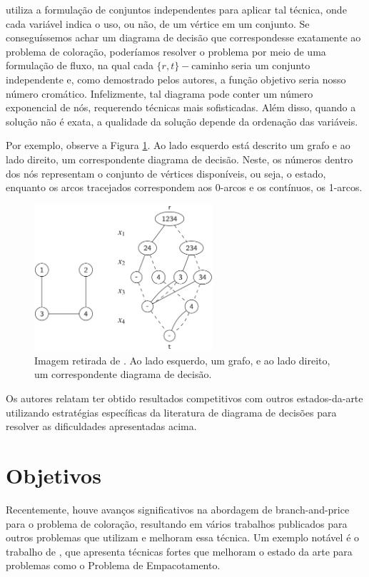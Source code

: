 \documentclass[11pt]{article}
\begin{document}
\textcite{Hoeve2021Graphcoloringdecision} utiliza a formulação de conjuntos independentes para aplicar tal técnica, onde cada variável indica o uso, ou não, de um vértice em um conjunto.
Se conseguíssemos achar um diagrama de decisão que correspondesse exatamente ao problema de coloração, poderíamos resolver o problema por meio de uma formulação de fluxo, na qual cada \(\{r,t\}-\text{caminho}\) seria um conjunto independente e, como demostrado pelos autores, a função objetivo seria nosso número cromático.
Infelizmente, tal diagrama pode conter um número exponencial de nós, requerendo técnicas mais sofisticadas.
Além disso, quando a solução não é exata, a qualidade da solução depende da ordenação das variáveis.

Por exemplo, observe a Figura \ref{fig:diagrama_decisão}.
Ao lado esquerdo está descrito um grafo e ao lado direito, um correspondente diagrama de decisão.
Neste, os números dentro dos nós representam o conjunto de vértices disponíveis, ou seja, o estado, enquanto os arcos tracejados correspondem aos 0-arcos e os contínuos, os 1-arcos.

\begin{figure}[htbp]
\centering
\includegraphics[width=250px]{./diagrama_decisao.png}
\caption{\label{fig:diagrama_decisão}Imagem retirada de \autocite{Hoeve2021Graphcoloringdecision}. Ao lado esquerdo, um grafo, e ao lado direito, um correspondente diagrama de decisão.}
\end{figure}

Os autores relatam ter obtido resultados competitivos com outros estados-da-arte utilizando estratégias específicas da literatura de diagrama de decisões para resolver as dificuldades apresentadas acima.

\section{Objetivos}
\label{sec:orgdece41c}
Recentemente, houve avanços significativos na abordagem de branch-and-price para o problema de coloração, resultando em vários trabalhos publicados para outros problemas que utilizam e melhoram essa técnica. Um exemplo notável é o trabalho de \textcite{Lima2022Exactsolutionnetwork}, que apresenta técnicas fortes que melhoram o estado da arte para problemas como o Problema de Empacotamento.
\end{document}
